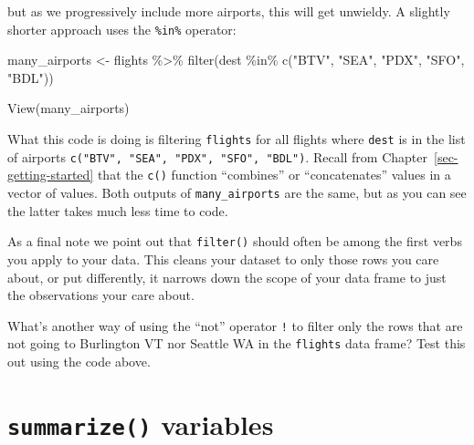 \documentclass[
  letterpaper,
  DIV=11,
  numbers=noendperiod]{scrreprt}
\newenvironment{Shaded}{\begin{snugshade}}{\end{snugshade}}
\newcommand{\FunctionTok}[1]{\textcolor[rgb]{0.28,0.35,0.67}{#1}}
\newcommand{\NormalTok}[1]{\textcolor[rgb]{0.00,0.23,0.31}{#1}}
\newcommand{\OtherTok}[1]{\textcolor[rgb]{0.00,0.23,0.31}{#1}}
\newcommand{\SpecialCharTok}[1]{\textcolor[rgb]{0.37,0.37,0.37}{#1}}
\newcommand{\StringTok}[1]{\textcolor[rgb]{0.13,0.47,0.30}{#1}}
\theoremstyle{definition}
\theoremstyle{remark}
\begin{document}
but as we progressively include more airports, this will get unwieldy. A
slightly shorter approach uses the \texttt{\%in\%} operator:

\begin{Shaded}
\begin{Highlighting}[]
\NormalTok{many\_airports }\OtherTok{\textless{}{-}}\NormalTok{ flights }\SpecialCharTok{\%\textgreater{}\%} 
  \FunctionTok{filter}\NormalTok{(dest }\SpecialCharTok{\%in\%} \FunctionTok{c}\NormalTok{(}\StringTok{"BTV"}\NormalTok{, }\StringTok{"SEA"}\NormalTok{, }\StringTok{"PDX"}\NormalTok{, }\StringTok{"SFO"}\NormalTok{, }\StringTok{"BDL"}\NormalTok{))}

\FunctionTok{View}\NormalTok{(many\_airports)}
\end{Highlighting}
\end{Shaded}

What this code is doing is filtering \texttt{flights} for all flights
where \texttt{dest} is in the list of airports
\texttt{c("BTV",\ "SEA",\ "PDX",\ "SFO",\ "BDL")}. Recall from
Chapter~\ref{sec-getting-started} that the \texttt{c()} function
``combines'' or ``concatenates'' values in a vector of values. Both
outputs of \texttt{many\_airports} are the same, but as you can see the
latter takes much less time to code.

As a final note we point out that \texttt{filter()} should often be
among the first verbs you apply to your data. This cleans your dataset
to only those rows you care about, or put differently, it narrows down
the scope of your data frame to just the observations your care about.

\begin{tcolorbox}[enhanced jigsaw, coltitle=black, toprule=.15mm, bottomtitle=1mm, breakable, leftrule=.75mm, title={{🎯} Learning Check 3.1}, opacitybacktitle=0.6, colback=white, rightrule=.15mm, opacityback=0, toptitle=1mm, colbacktitle=quarto-callout-tip-color!10!white, colframe=quarto-callout-tip-color-frame, titlerule=0mm, arc=.35mm, bottomrule=.15mm, left=2mm]
What's another way of using the ``not'' operator \texttt{!} to filter
only the rows that are not going to Burlington VT nor Seattle WA in the
\texttt{flights} data frame? Test this out using the code above.
\end{tcolorbox}

\hypertarget{sec-summarize}{%
\section{\texorpdfstring{\texttt{summarize()}
variables}{summarize() variables}}\label{sec-summarize}}
\end{document}
